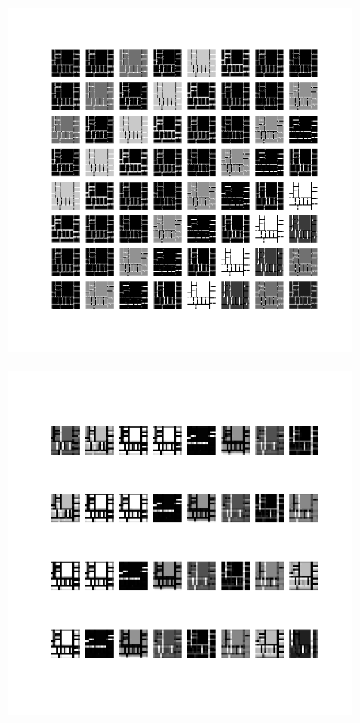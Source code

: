 \begin{figure}
    \centering
    \begin{subfigure}[b]{0.40\linewidth}
        \includegraphics[width=\linewidth]{images/cae_online_lstm/caelstm_section_cae_training_house_10000_model_feature_maps_map_0_0_3.png}
    \end{subfigure}
    \hfill
    \begin{subfigure}[b]{0.40\linewidth}
        \includegraphics[width=\linewidth]{images/cae_online_lstm/caelstm_section_cae_training_house_10000_model_feature_maps_map_0_0_2.png}

\end{subfigure}
\end{figure}
